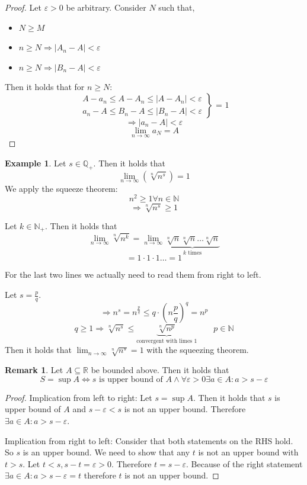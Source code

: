 \documentclass[a4paper,landscape,twocolumn]{article}
\theoremstyle{definition}
\newtheorem{rem}{Remark}
\newtheorem{ex}{Example}
\newcommand\abs[1]{\left|#1\right|}
\begin{document}
\begin{proof}
  Let $\varepsilon > 0$ be arbitrary.
  Consider $N$ such that,
  \begin{itemize}
    \item $N \geq M$
    \item $n \geq N \Rightarrow \abs{A_n - A} < \varepsilon$
    \item $n \geq N \Rightarrow \abs{B_n - A} < \varepsilon$
  \end{itemize}
  Then it holds that for $n \geq N$:
  \[
    \left.\begin{array}{c}
      A - a_n \leq A - A_n \leq \abs{A - A_n} < \varepsilon \\
      a_n - A \leq B_n - A \leq \abs{B_n - A} < \varepsilon
    \end{array}\right\} \text{ = 1}
  \] \[
    \Rightarrow \abs{a_n - A} < \varepsilon
  \] \[
    \lim_{n \to \infty} a_N = A
  \]
\end{proof}

\begin{ex}
  Let $s \in \mathbb Q_+$. Then it holds that
  \[ \lim_{n \to \infty} \left(\sqrt[n]{n^s}\right) = 1 \]
  We apply the squeeze theorem:
  \[ n^2 \geq 1 \forall n \in \mathbb N \]
  \[ \Rightarrow \sqrt[n]{n^s} \geq 1 \]

  Let $k \in \mathbb N_+$. Then it holds that
  \[ \lim_{n \to \infty} \sqrt[n]{n^k} = \lim_{n \to \infty} \underbrace{\sqrt[n]{n} \sqrt[n]{n} \dots \sqrt[n]{n}}_{k \text { times}} \]
  \[ = 1 \cdot 1 \cdot 1 \dots = 1 \]

  For the last two lines we actually need to read them from right to left.

  Let $s = \frac pq$.
  \[ \Rightarrow n^s = n^{\frac pq} \leq q \cdot \left(n \frac{p}{q}\right)^q = n^p \]
  \[ q \geq 1 \Rightarrow \sqrt[n]{n^s}  \leq \underbrace{\sqrt[n]{n^p}}_{\text{convergent with limes }1} \qquad p \in \mathbb N \]
  Then it holds that $\lim_{n \to \infty} \sqrt[n]{n^s} = 1$ with the squeezing theorem.
\end{ex}

\begin{rem}
  Let $A \subseteq \mathbb R$ be bounded above. Then it holds that
  \[
      S = \sup{A}
      \Leftrightarrow
          s \text{ is upper bound of } A \land
          \forall \varepsilon > 0 \exists a \in A: a > s - \varepsilon
  \]
\end{rem}

\begin{proof}
  Implication from left to right:
  Let $s = \sup{A}$. Then it holds that $s$ is upper bound of $A$
  and $s - \varepsilon <  s$ is not an upper bound. Therefore $\exists a \in A: a > s - \varepsilon$.

  Implication from right to left:
  Consider that both statements on the RHS hold. So $s$ is an upper bound.
  We need to show that any $t$ is not an upper bound with $t > s$.
  Let $t < s, s - t = \varepsilon > 0$. Therefore $t = s - \varepsilon$.
  Because of the right statement $\exists a \in A: a > s - \varepsilon = t$ therefore $t$ is not an upper bound.
\end{proof}
\end{document}
